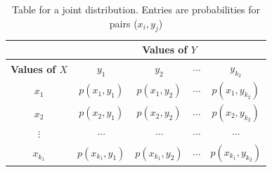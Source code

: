 \begin{table}[h]
	\caption{Table for a joint distribution. Entries are probabilities for pairs ($x_i, y_j$)}
	\label{table:generalJointDistribution}
	\centering
	\begin{tabular}{ccccc}
		\hline
		& \multicolumn{4}{c}{\textbf{Values of $Y$}} \\
		\hline
		\textbf{Values of $X$} & $y_1$ & $y_2$ & $\cdots$ & $y_{k_2}$ \\
		             $x_1$ &   $p(x_1, y_1)$ &   $p(x_1, y_2)$  & $\cdots$  & $p(x_1, y_{k_2})$  \\
		              $x_2$ &  $p(x_2, y_1)$   &  $p(x_2, y_2)$  & $\cdots$ &   $p(x_2, y_{k_2})$ \\
		             $\vdots$ &   $\cdots$  &  $\cdots$  &  $\cdots$ &   $\cdots$ \\
		              $x_{k_1}$ & $p(x_{k_1}, y_1)$ &  $p(x_{k_1}, y_2)$  &  $\cdots$ & $p(x_{k_1}, y_{k_2})$ \\
		             
	\end{tabular}
\end{table}

